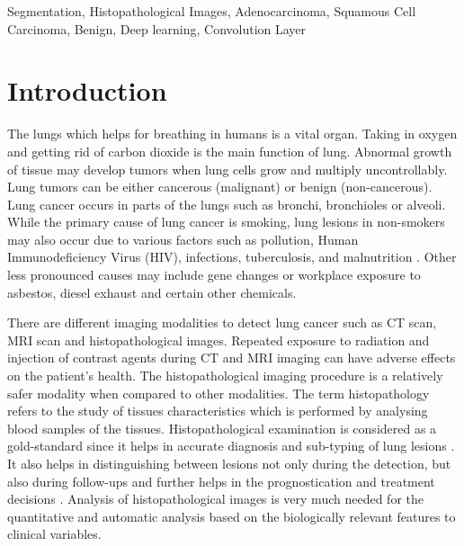 \documentclass[conference]{IEEEtran}
\begin{document}
\begin{IEEEkeywords}
Segmentation, Histopathological Images, Adenocarcinoma, Squamous Cell Carcinoma, Benign, Deep learning, Convolution Layer
\end{IEEEkeywords}

\section{Introduction}
 The lungs which helps for breathing in humans is a vital organ. Taking in oxygen and getting rid of carbon dioxide is the main function of lung. Abnormal growth of tissue may develop tumors when lung cells grow and multiply uncontrollably.  Lung tumors can be either cancerous (malignant) or benign (non-cancerous). Lung cancer occurs in parts of the lungs such as bronchi, bronchioles or alveoli. While the primary cause of lung cancer is smoking, lung lesions in non-smokers may also occur due to various factors such as pollution, Human Immunodeficiency Virus (HIV), infections, tuberculosis, and malnutrition \cite{lad}. Other less pronounced causes may include gene changes or workplace exposure to asbestos, diesel exhaust and certain other chemicals. 
 
 There are different imaging modalities to detect lung cancer such as CT scan, MRI scan and histopathological images. Repeated exposure to radiation and injection of contrast agents during CT and MRI imaging can have adverse effects on the patient's health. The histopathological imaging procedure is a relatively safer modality when compared to other modalities. The term histopathology refers to the study of tissues characteristics which is performed by analysing blood samples of the tissues. Histopathological examination is considered as a gold-standard since it helps in accurate diagnosis and sub-typing of lung lesions \cite{histo_study_lungbiopsy}. It also helps in distinguishing between lesions not only during the detection, but also during follow-ups and further helps in the prognostication and treatment decisions \cite{histopath_role}. Analysis of histopathological images is very much needed for the quantitative and automatic analysis  based  on the biologically relevant features to clinical variables.
\end{document}
